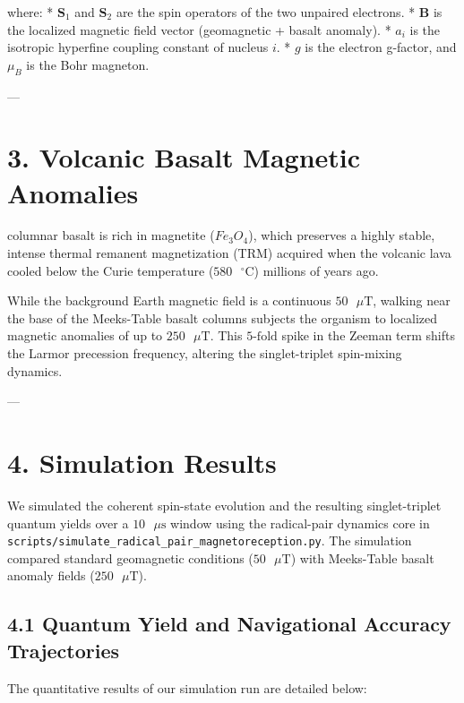 \documentclass[11pt,twocolumn]{article}
\begin{document}
where:
*   $\mathbf{S}_1$ and $\mathbf{S}_2$ are the spin operators of the two unpaired electrons.
*   $\mathbf{B}$ is the localized magnetic field vector (geomagnetic + basalt anomaly).
*   $a_i$ is the isotropic hyperfine coupling constant of nucleus $i$.
*   $g$ is the electron g-factor, and $\mu_B$ is the Bohr magneton.

---

\section{3. Volcanic Basalt Magnetic Anomalies}
columnar basalt is rich in magnetite ($Fe_3O_4$), which preserves a highly stable, intense thermal remanent magnetization (TRM) acquired when the volcanic lava cooled below the Curie temperature ($580\text{ }^\circ\text{C}$) millions of years ago. 

While the background Earth magnetic field is a continuous $50\text{ }\mu\text{T}$, walking near the base of the Meeks-Table basalt columns subjects the organism to localized magnetic anomalies of up to $250\text{ }\mu\text{T}$. This $5\text{-fold}$ spike in the Zeeman term shifts the Larmor precession frequency, altering the singlet-triplet spin-mixing dynamics.

---

\section{4. Simulation Results}
We simulated the coherent spin-state evolution and the resulting singlet-triplet quantum yields over a $10\text{ }\mu\text{s}$ window using the radical-pair dynamics core in \texttt{scripts/simulate_radical_pair_magnetoreception.py}. The simulation compared standard geomagnetic conditions ($50\text{ }\mu\text{T}$) with Meeks-Table basalt anomaly fields ($250\text{ }\mu\text{T}$).

\subsection{4.1 Quantum Yield and Navigational Accuracy Trajectories}
The quantitative results of our simulation run are detailed below:
\end{document}
